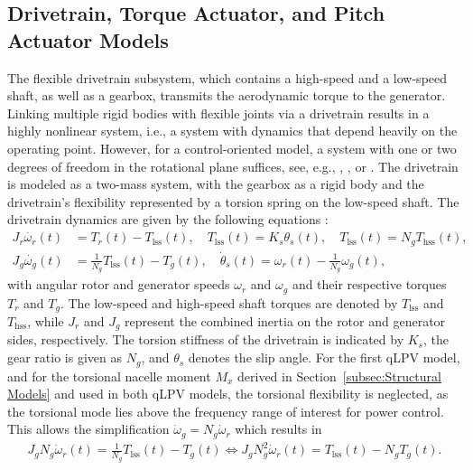 \subsection{Drivetrain, Torque Actuator, and Pitch Actuator Models}\label{subsec:drivetrain, Torque Actuator, and Pitch Actuator Models}
The flexible drivetrain subsystem, which contains a high-speed and a low-speed shaft, as well as a gearbox, transmits the aerodynamic torque to the generator. Linking multiple rigid bodies with flexible joints via a drivetrain results in a highly nonlinear system, i.e., a system with dynamics that depend heavily on the operating point. However, for a control-oriented model, a system with one or two degrees of freedom in the rotational plane suffices, see, e.g., \cite{Bianchi2007}, \cite{peeters2006analysis}, or \cite{sharan2018actuator}.  
%
The drivetrain is modeled as a two-mass system, with the gearbox as a rigid body and the drivetrain's flexibility represented by a torsion spring on the low-speed shaft. The drivetrain dynamics are given by the following equations \cite{sharan2018actuator}:
\begin{align} 
    J_{r}\dot{\omega_{r}}(t) &= T_{r}(t) - T_{\text{lss}}(t), \quad T_{\text{lss}}(t) = K_{s}\theta_{s}(t), \quad T_{\text{lss}}(t) = N_{g}T_{\text{hss}}(t), \nonumber\\
    J_{g}\dot{\omega_{g}}(t) &= \frac{1}{N_{g}} T_{\text{lss}}(t) - T_{g}(t), \quad \dot{\theta}_{s}(t) = \omega_{r}(t) - \frac{1}{N_{g}} \omega_{g}(t), \label{eq:DrvTr}
\end{align}
with angular rotor and generator speeds $\omega_{r}$ and $\omega_{g}$ and their respective torques $T_{r}$ and $T_{g}$. The low-speed and high-speed shaft torques are denoted by $T_{\text{lss}}$ and $T_{\text{hss}}$, while $J_{r}$ and $J_{g}$ represent the combined inertia on the rotor and generator sides, respectively. The torsion stiffness of the drivetrain is indicated by $K_{s}$, the gear ratio is given as $N_{g}$, and $\theta_{s}$ denotes the slip angle. For the first qLPV model, and for the torsional nacelle moment $M_x$ derived in Section~\ref{subsec:Structural Models} and used in both qLPV models, the torsional flexibility is neglected, as the torsional mode lies above the frequency range of interest for power control. This allows the simplification $\dot{\omega}_g = N_g \dot{\omega}_r$ which results in
\begin{align} \label{eq:DrivetrainStiff}
    J_{g}N_g \dot{\omega}_r(t) = \frac{1}{N_{g}} T_{\text{lss}}(t) - T_{g}(t) \iff J_{g}N^2_g \dot{\omega}_r(t) = T_{\text{lss}}(t) - N_gT_{g}(t).
\end{align}
